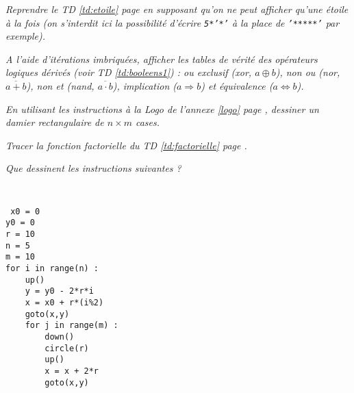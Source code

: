 \begin{td}\label{td:etoile2}
\em
Reprendre le TD \ref{td:etoile} page \pageref{td:etoile} en supposant qu'on ne peut 
afficher qu'une étoile à la fois (on s'interdit ici la possibilité d'écrire
{\tt 5*'*'} à la place de {\tt '*****'} par exemple).
\end{td}

\begin{td}\label{td:booleens2}
\em
A l'aide d'itérations imbriquées, afficher les tables de vérité des 
opérateurs logiques dérivés (voir TD \ref{td:booleens1}) : 
ou exclusif ({\em xor}, $a \oplus b$), 
non ou ({\em nor}, $\overline{a+b}$), 
non et ({\em nand}, $\overline{a\cdot b}$), 
implication ($a \Rightarrow b$) et  
équivalence ($a \Leftrightarrow b$).
\end{td}

\begin{td}[Damier]\label{td:damier}
\em
En utilisant les instructions {\em à la {\sc Logo}} de l'annexe \ref{logo} page \pageref{logo},
dessiner un damier rectangulaire de $n\times m$ cases.
\end{td}

\begin{td}\label{td:traceFactorielle}
\em
Tracer la fonction factorielle du TD \ref{td:factorielle} page
\pageref{td:factorielle}.
\end{td}

\begin{td}\label{td:quinconce}
\em
Que dessinent les instructions suivan\-tes ?
\vspace*{1mm}

	{\tt \mbox{}\ \ }\begin{minipage}{5cm}\tt
	x0 = 0\\
	y0 = 0\\
	r = 10\\
	n = 5\\
	m = 10\\
	for i in range(n) :\\
	\mbox{}\ \ \ \ up()\\
	\mbox{}\ \ \ \ y = y0 - 2*r*i\\
	\mbox{}\ \ \ \ x = x0 + r*(i\%2)\\
	\mbox{}\ \ \ \ goto(x,y)\\
	\mbox{}\ \ \ \ for j in range(m) :\\
	\mbox{}\ \ \ \ \ \ \ \ down()\\
	\mbox{}\ \ \ \ \ \ \ \ circle(r)\\
	\mbox{}\ \ \ \ \ \ \ \ up()\\
	\mbox{}\ \ \ \ \ \ \ \ x = x + 2*r\\
	\mbox{}\ \ \ \ \ \ \ \ goto(x,y)
	\end{minipage}
\end{td}


